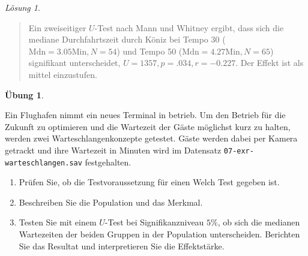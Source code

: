 \documentclass[
]{book}
\providecommand{\tightlist}{%
  \setlength{\itemsep}{0pt}\setlength{\parskip}{0pt}}
\theoremstyle{definition}
\theoremstyle{definition}
\theoremstyle{definition}
\newtheorem{exercise}{Übung}[chapter]
\theoremstyle{definition}
\theoremstyle{remark}
\newtheorem*{solution}{Lösung}
\begin{document}
\begin{solution}
\begin{quote}
Ein zweiseitiger \(U\)-Test nach Mann und Whitney ergibt, dass sich die mediane Durchfahrtszeit durch Köniz bei Tempo 30 (\(\text{Mdn}= 3.05 \text{Min}, N =54\)) und Tempo 50 (\(\text{Mdn}=4.27 \text{Min}, N = 65\)) signifikant unterscheidet, \(U = 1357, p = .034, r = -0.227\). Der Effekt ist als mittel einzustufen.
\end{quote}

\end{solution}

\begin{exercise}
\protect\hypertarget{exr:warteschlangen}{}\label{exr:warteschlangen}\leavevmode

Ein Flughafen nimmt ein neues Terminal in betrieb. Um den Betrieb für die Zukunft zu optimieren und die Wartezeit der Gäste möglichst kurz zu halten, werden zwei Warteschlangenkonzepte getestet. Gäste werden dabei per Kamera getrackt und ihre Wartezeit in Minuten wird im Datensatz \texttt{07-exr-warteschlangen.sav} festgehalten.

\begin{enumerate}
\def\labelenumi{\alph{enumi})}
\tightlist
\item
  Prüfen Sie, ob die Testvoraussetzung für einen Welch Test gegeben ist.
\item
  Beschreiben Sie die Population und das Merkmal.
\item
  Testen Sie mit einem \(U\)-Test bei Signifikanzniveau \(5\%\), ob sich die medianen Wartezeiten der beiden Gruppen in der Population unterscheiden. Berichten Sie das Resultat und interpretieren Sie die Effektstärke.
\end{enumerate}

\end{exercise}
\end{document}
